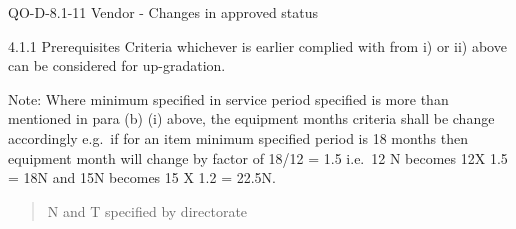 \documentclass[
  ignorenonframetext,
]{beamer}
\begin{document}
\begin{frame}{QO-D-8.1-11 Vendor - Changes in approved status}
\begin{block}{4.1.1 Prerequisites}
Criteria whichever is earlier complied with from i) or ii) above can be
considered for up-gradation.

Note: Where minimum specified in service period specified is more than
mentioned in para (b) (i) above, the equipment months criteria shall be
change accordingly e.g.~if for an item minimum specified period is 18
months then equipment month will change by factor of 18/12 = 1.5 i.e.~12
N becomes 12X 1.5 = 18N and 15N becomes 15 X 1.2 = 22.5N.

\begin{quote}
N and T specified by directorate
\end{quote}


\end{block}
\end{frame}
\end{document}
